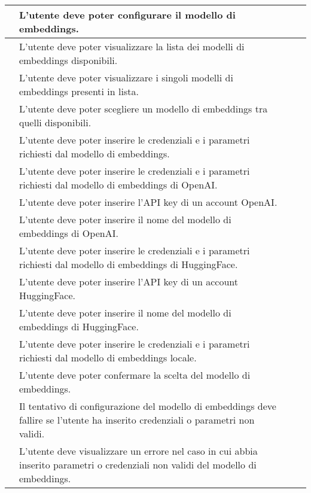 \documentclass[10pt, a4paper]{article}
\begin{document}
\begin{xltabular}{\textwidth}{|c|X|c|c}
\hline {} & L'utente deve poter configurare il modello di embeddings. &  \\
\hline {} & L'utente deve poter visualizzare la lista dei modelli di embeddings disponibili. &  \\
\hline {} & L'utente deve poter visualizzare i singoli modelli di embeddings presenti in lista. &  \\
\hline {} & L'utente deve poter scegliere un modello di embeddings tra quelli disponibili. &  \\
\hline {} & L'utente deve poter inserire le credenziali e i parametri richiesti dal modello di embeddings. &  \\
\hline {} & L'utente deve poter inserire le credenziali e i parametri richiesti dal modello di embeddings di OpenAI. &  \\
\hline {} & L'utente deve poter inserire l'API key di un account OpenAI. &  \\
\hline {} & L'utente deve poter inserire il nome del modello di embeddings di OpenAI. &  \\
\hline {} & L'utente deve poter inserire le credenziali e i parametri richiesti dal modello di embeddings di HuggingFace. &  \\
\hline {} & L'utente deve poter inserire l'API key di un account HuggingFace. &  \\
\hline {} & L'utente deve poter inserire il nome del modello di embeddings di HuggingFace. &  \\
\hline {} & L'utente deve poter inserire le credenziali e i parametri richiesti dal modello di embeddings locale. &  \\
\hline {} & L'utente deve poter confermare la scelta del modello di embeddings. &  \\
\hline {} & Il tentativo di configurazione del modello di embeddings deve fallire se l'utente ha inserito credenziali o parametri non validi. &  \\
\hline {} & L'utente deve visualizzare un errore nel caso in cui abbia inserito parametri o credenziali non validi del modello di embeddings. &  \\


\end{xltabular}
\end{document}
